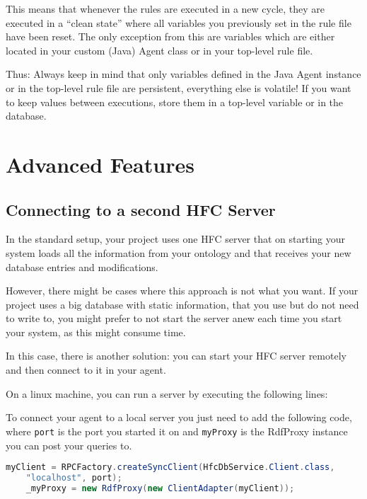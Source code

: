 This means that whenever the \vonda rules are executed in a new cycle,
they are executed in a ``clean state'' where all variables you
previously set in the rule file have been reset. The only exception
from this are variables which are either located in your custom (Java)
Agent class or in your top-level rule file.

Thus: Always keep in mind that only variables defined in the Java
Agent instance or in the top-level rule file are persistent,
everything else is volatile! If you want to keep values between
executions, store them in a top-level variable or in the database.

\section{Advanced Features}

\subsection{Connecting to a second HFC Server} \label{sec:2ndHfc}
In the standard setup, your \vonda project uses one HFC server that on starting your system loads all the information from your ontology and that receives your new database entries and modifications.

However, there might be cases where this approach is not what you want. If your project uses a big database with static information, that you use but do not need to write to, you might prefer to not start the server anew each time you start your system, as this might consume time.

In this case, there is another solution: you can start your HFC server remotely and then connect to it in your \vonda agent.

On a linux machine, you can run a server by executing the following lines:

To connect your \vonda agent to a local server you just need to add the following code, where \texttt{port} is the port you started it on and \texttt{myProxy} is the RdfProxy instance you can post your queries to.

\begin{center}
  \begin{lstlisting}[language=Java]
    myClient = RPCFactory.createSyncClient(HfcDbService.Client.class,
    "localhost", port);
    _myProxy = new RdfProxy(new ClientAdapter(myClient));
  \end{lstlisting}
\end{center}

